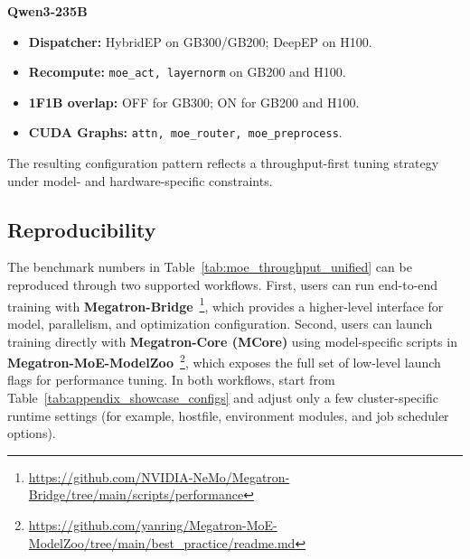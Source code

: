 \textbf{Qwen3-235B}
\begin{itemize}[noitemsep,topsep=0pt]
    \item \textbf{Dispatcher:} HybridEP on GB300/GB200; DeepEP on H100.
    \item \textbf{Recompute:} \texttt{moe\_act, layernorm} on GB200 and H100.
    \item \textbf{1F1B overlap:} OFF for GB300; ON for GB200 and H100.
    \item \textbf{CUDA Graphs:} \texttt{attn, moe\_router, moe\_preprocess}.
\end{itemize}
The resulting configuration pattern reflects a throughput-first tuning strategy under model- and hardware-specific constraints.

\subsection{Reproducibility} 
The benchmark numbers in Table~\ref{tab:moe_throughput_unified} can be reproduced through two supported workflows. First, users can run end-to-end training with \textbf{Megatron-Bridge}~\footnote{\url{https://github.com/NVIDIA-NeMo/Megatron-Bridge/tree/main/scripts/performance}}, which provides a higher-level interface for model, parallelism, and optimization configuration. Second, users can launch training directly with \textbf{Megatron-Core (MCore)} using model-specific scripts in \textbf{Megatron-MoE-ModelZoo}~\footnote{\url{https://github.com/yanring/Megatron-MoE-ModelZoo/tree/main/best_practice/readme.md}}, which exposes the full set of low-level launch flags for performance tuning. In both workflows, start from Table~\ref{tab:appendix_showcase_configs} and adjust only a few cluster-specific runtime settings (for example, hostfile, environment modules, and job scheduler options).


